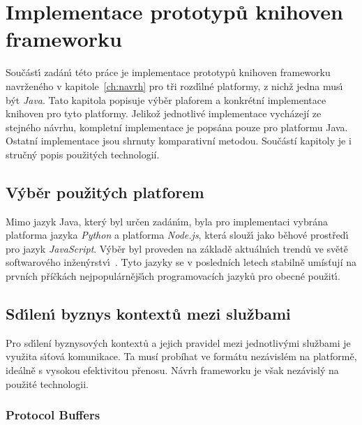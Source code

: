 

\chapter{Implementace prototypů knihoven frameworku}\label{ch:implementace}

Součást\'{\i} zadán\'{\i} této práce je implementace prototypů
knihoven frameworku navrženého v kapitole~\ref{ch:navrh}
pro tři rozd\'{\i}lné platformy, z nichž jedna mus\'{\i} b\'yt \textit{Java}.
Tato kapitola popisuje výběr plaforem a konkrétní implementace
knihoven pro tyto platformy. Jelikož jednotlivé implementace
vycházejí ze stejného návrhu, kompletní implementace
je popsána pouze pro platformu Java. Ostatní implementace jsou
shrnuty komparativní metodou. Součástí kapitoly je i stručný popis
použitých technologií.

\section{V\'yběr použit\'ych platforem}

Mimo jazyk Java, kter\'y byl určen zadán\'{\i}m, byla pro
implementaci vybrána platforma jazyka \textit{Python} a platforma \textit{Node.js},
která slouž\'{\i} jako běhové prostřed\'{\i} pro jazyk \textit{JavaScript}.
V\'yběr byl proveden na základě aktuáln\'{\i}ch trendů ve světě softwarového
inžen\'yrstv\'{\i}~\cite{githut, octoverse, stackoverflowsurvey}.
Tyto jazyky se v posledních letech stabilně umísťují na prvních příčkách
nejpopulárnějš\'{\i}ch programovacích jazyků pro obecné použit\'{\i}.

\section{Sd\'{\i}len\'{\i} byznys kontextů mezi službami}

Pro sd\'{\i}lení byznysových kontextů a jejich pravidel
mezi jednotliv\'ymi službami je využita s\'{\i}ťová komunikace.
Ta musí probíhat ve formátu nezávislém na platformě, ideálně s vysokou
efektivitou přenosu. Návrh frameworku je však nezávislý na použité technologii.

\subsection{Protocol Buffers}

